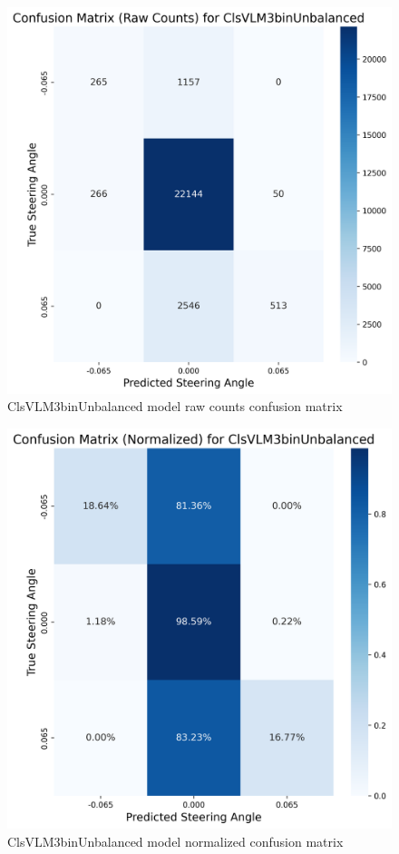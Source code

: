 \begin{figure}[H]
\centering
\includegraphics[width=0.65\linewidth]{Figures/Results/cm_raw_ClsVLM3binUnbalanced.png}
\caption{ClsVLM3binUnbalanced model raw counts confusion matrix}
\label{fig:cm_raw_ClsVLM3binUnbalanced}
\end{figure}


\begin{figure}[H]
\centering
\includegraphics[width=0.65\linewidth]{Figures/Results/cm_norm_ClsVLM3binUnbalanced.png}
\caption{ClsVLM3binUnbalanced model normalized confusion matrix}
\label{fig:cm_norm_ClsVLM3binUnbalanced}
\end{figure}


